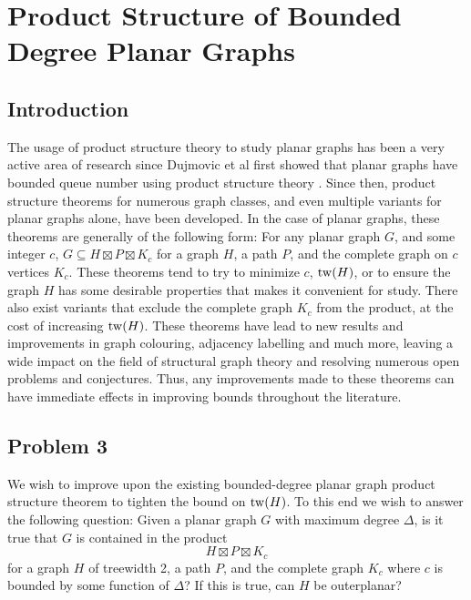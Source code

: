 \documentclass[../main.tex]{subfiles}
\begin{document}
	
	\section{Product Structure of Bounded Degree Planar Graphs}
	\subsection{Introduction}
	The usage of product structure theory to study planar graphs has been a very active area of research since Dujmovic et al first showed that planar graphs have bounded queue number using product structure theory \cite{DJMMUW20}. Since then, product structure theorems for numerous graph classes, and even multiple variants for planar graphs alone, have been developed. 
	In the case of planar graphs, these theorems are generally of the following form: For any planar graph $G$, and some integer $c$, $G\subseteq H \boxtimes P \boxtimes K_c$ for a graph $H$, a path $P$, and the complete graph on $c$ vertices $K_c$. These theorems tend to try to minimize $c$, $\operatorname{tw}(H)$, or to ensure the graph $H$ has some desirable properties that makes it convenient for study. There also exist variants that exclude the complete graph $K_c$ from the product, at the cost of increasing $\operatorname{tw}(H)$.
	These theorems have lead to new results and improvements in graph colouring\cite{DEJWW20}, adjacency labelling\cite{DEJGMM21,EJM23} and much more, leaving a wide impact on the field of structural graph theory and resolving numerous open problems and conjectures. Thus, any improvements made to these theorems can have immediate effects in improving bounds throughout the literature.
	
	\subsection{Problem 3}
	We wish to improve upon the existing bounded-degree planar graph product structure theorem to tighten the bound on $\operatorname{tw}(H)$. To this end we wish to answer the following question: Given a planar graph $G$ with maximum degree $\Delta$, is it true that $G$ is contained in the product $$H\boxtimes P\boxtimes K_c$$ for a graph $H$ of treewidth 2, a path $P$, and the complete graph $K_c$ where $c$ is bounded by some function of $\Delta$? If this is true, can $H$ be outerplanar? 
	
\end{document}
